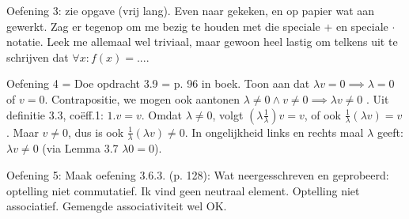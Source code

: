 \documentclass{article}
\begin{document}
Oefening 3: zie opgave (vrij lang). Even naar gekeken, en op papier wat aan gewerkt. Zag er tegenop om me bezig te houden met die speciale + en speciale $\cdot$ notatie. Leek me allemaal wel triviaal, maar gewoon heel lastig om telkens uit te schrijven dat $\forall x: f(x)=...$. 

Oefening 4 = Doe opdracht 3.9 = p. 96 in boek. Toon aan dat $\lambda v = 0 \implies \lambda = 0$ of $v=0$. Contrapositie, we mogen ook aantonen $\lambda \neq 0 \land v \neq 0 \implies  \lambda v \neq 0$ . Uit definitie 3.3, co\"eff.1: $1.v = v$. Omdat $\lambda \neq 0$, volgt $ (\lambda \frac{1}{\lambda}) v = v$, of ook $  \frac{1}{\lambda} ( \lambda v ) = v$. Maar $v \neq 0$, dus is ook $  \frac{1}{\lambda} ( \lambda v ) \neq 0 $. In ongelijkheid links en rechts maal $\lambda$ geeft: $ \lambda v \neq 0$ (via Lemma 3.7 $\lambda 0 = 0$). 

Oefening 5: Maak oefening 3.6.3. (p. 128): Wat neergesschreven en geprobeerd: optelling niet commutatief. Ik vind geen neutraal element. Optelling niet associatief. Gemengde associativiteit wel OK.  
\end{document}
